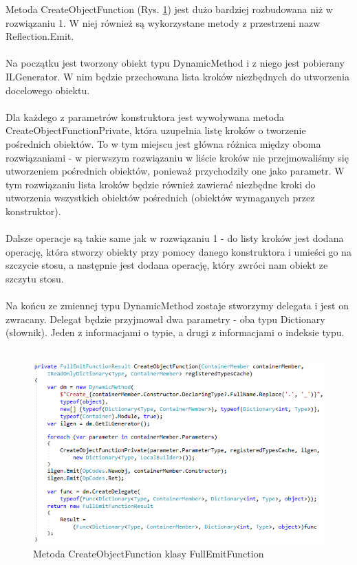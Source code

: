 \documentclass[12pt]{article}
\begin{document}
Metoda CreateObjectFunction (Rys. \ref{fig:FullEmitFunction_CreateObjectFunction}) jest dużo bardziej rozbudowana niż w rozwiązaniu 1. W niej również są wykorzystane metody z przestrzeni nazw Reflection.Emit.\\
\\
Na początku jest tworzony obiekt typu DynamicMethod i z niego jest pobierany ILGenerator. W nim będzie przechowana lista kroków niezbędnych do utworzenia docelowego obiektu.\\
\\
Dla każdego z parametrów konstruktora jest wywoływana metoda CreateObjectFunctionPrivate, która uzupełnia listę kroków o tworzenie pośrednich obiektów. To w tym miejscu jest główna różnica między oboma rozwiązaniami - w pierwszym rozwiązaniu w liście kroków nie przejmowaliśmy się utworzeniem pośrednich obiektów, ponieważ przychodziły one jako parametr. W tym rozwiązaniu lista kroków będzie również zawierać niezbędne kroki do utworzenia wszystkich obiektów pośrednich (obiektów wymaganych przez konstruktor).\\
\\
Dalsze operacje są takie same jak w rozwiązaniu 1 - do listy kroków jest dodana operację, która stworzy obiekty przy pomocy danego konstruktora i umieści go na szczycie stosu, a następnie jest dodana operację, który zwróci nam obiekt ze szczytu stosu.\\
\\
Na końcu ze zmiennej typu DynamicMethod zostaje stworzymy delegata i jest on zwracany. Delegat będzie przyjmował dwa parametry - oba typu Dictionary (słownik). Jeden z informacjami o typie, a drugi z informacjami o indeksie typu.\\ \\
\begin{figure}[H]
	\begin{center}
  		\includegraphics{FullEmitFunction_CreateObjectFunction.png}
  		\caption{Metoda CreateObjectFunction klasy FullEmitFunction}
  		\label{fig:FullEmitFunction_CreateObjectFunction}
	\end{center}
\end{figure}
\end{document}
